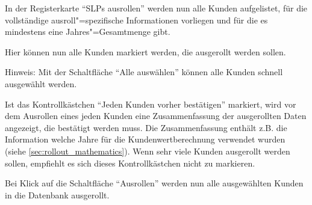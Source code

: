 In der Registerkarte "`SLPs ausrollen"' werden nun alle Kunden aufgelistet, für die vollständige ausroll"=spezifische Informationen vorliegen und für die es mindestens eine Jahres"=Gesamtmenge gibt.

Hier können nun alle Kunden markiert werden, die ausgerollt werden sollen.

Hinweis: Mit der Schaltfläche "`Alle auswählen"' können alle Kunden schnell ausgewählt werden.

Ist das Kontrollkästchen "`Jeden Kunden vorher bestätigen"' markiert, wird vor dem Ausrollen eines jeden Kunden eine Zusammenfassung der ausgerollten Daten angezeigt, die bestätigt werden muss. Die Zusammenfassung enthält z.B. die Information welche Jahre für die Kundenwertberechnung verwendet wurden (siehe \vref{sec:rollout_mathematics}). Wenn sehr viele Kunden ausgerollt werden sollen, empfiehlt es sich dieses Kontrollkästchen nicht zu markieren.

Bei Klick auf die Schaltfläche "`Ausrollen"' werden nun alle ausgewählten Kunden in die Datenbank ausgerollt.
